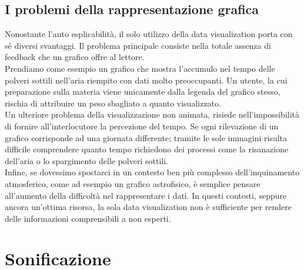 \subsection{I problemi della rappresentazione grafica}
Nonostante l’auto esplicabilità, il solo utilizzo della data visualization porta con sé diversi svantaggi. 
Il problema principale consiste nella totale assenza di feedback che un grafico offre al lettore.
\\
Prendiamo come esempio un grafico che mostra l'accumulo nel tempo delle polveri sottili nell'aria riempito con dati molto preoccupanti. 
Un utente, la cui preparazione sulla materia viene unicamente dalla legenda del grafico stesso, rischia di attribuire un peso sbagliato a quanto visualizzato.
\\ 
Un ulteriore problema della visualizzazione non animata, risiede nell'impossibilità di fornire all’interlocutore la percezione del tempo. 
Se ogni rilevazione di un grafico corrisponde ad una giornata differente; tramite le sole immagini risulta difficile comprendere quanto tempo richiedono dei processi come la risanazione dell'aria o lo spargimento delle polveri sottili.
\\ 
Infine, se dovessimo spostarci in un contesto ben più complesso dell’inquinamento atmosferico, come ad esempio un grafico astrofisico, è semplice pensare all’aumento della difficoltà nel rappresentare i dati. 
In questi contesti, seppure ancora un'ottima risorsa, la sola data visualization non è sufficiente per rendere delle informazioni comprensibili a non esperti.


\section{Sonificazione}
